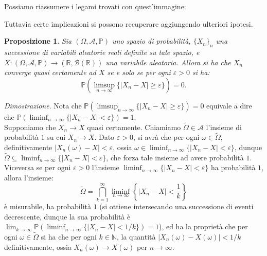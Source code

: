 \documentclass[11pt]{book}
\makeatletter
\theoremstyle{Definizione}
\theoremstyle{TeoremaProposizioneLemmaCorollario}
\newtheorem{mypropo}[myteo]{Proposizione}
\theoremstyle{OsservazioneNota}
\renewenvironment{proof}[1][\proofname]{\par
  \normalfont \topsep6\p@\@plus6\p@\relax
  \trivlist
  \item[\hskip\labelsep
        \itshape
    #1\@addpunct{.}]\ignorespaces
}{%
  \endtrivlist\@endpefalse
}
\newcommand{\R}{\mathbb{R}}
\newcommand{\N}{\mathbb{N}}
\renewcommand{\P}{\mathbb{P}}
\renewenvironment{proof}{\textsl{Dimostrazione}.}{}
\makeatother
\begin{document}
Possiamo riassumere i legami trovati con quest'immagine:
\begin{center}
\end{center}
Tuttavia certe implicazioni si possono recuperare aggiungendo ulteriori ipotesi.
\begin{boxpro}
\begin{mypropo}
Sia $(\Omega,\mathcal{A},\P)$ uno spazio di probabilità, $\{X_n\}_n$ una successione di variabili aleatorie reali definite su tale spazio, e $X:(\Omega,\mathcal{A},\P)\longrightarrow (\R,\mathcal{B}(\R))$ una variabile aleatoria. Allora si ha che $X_n$ converge quasi certamente ad $X$ se e solo se per ogni $\varepsilon > 0$ si ha:
$$
\P\left(\limsup_{n \to \infty} \{|X_n-X| \geq \varepsilon\}\right) = 0.
$$
\end{mypropo}
\tcblower
\begin{proof}
Nota che $\P(\limsup_{n\to\infty}\{|X_n-X|\geq \varepsilon\}) = 0$ equivale a dire che $\P(\liminf_{n\to\infty}\{|X_n-X|<\varepsilon\}) = 1$.\\
Supponiamo che $X_n \to X$ quasi certamente. Chiamiamo $\widetilde{\Omega}\in \mathcal{A}$ l'insieme di probabilità $1$ su cui $X_n \to X$. Dato $\varepsilon > 0$, si avrà che per ogni $\omega\in \widetilde{\Omega}$, definitivamente $|X_n(\omega)-X| < \varepsilon$, ossia $\omega \in \liminf_{n\to\infty}\{|X_n-X|<\varepsilon\}$, dunque $\widetilde{\Omega} \subseteq \liminf_{n\to\infty}\{|X_n-X|<\varepsilon\}$, che forza tale insieme ad avere probabilità $1$. Viceversa se per ogni $\varepsilon>0$ l'insieme $\liminf_{n\to\infty} \{|X_n-X| < \varepsilon\}$ ha probabilità $1$, allora l'insieme:
$$
\widetilde{\Omega} = \bigcap_{k = 1}^\infty \liminf_{n\to\infty} \left\{|X_n-X|< \frac{1}{k}\right\}
$$
è misurabile, ha probabilità $1$ (si ottiene intersecando una successione di eventi decrescente, dunque la sua probabilità è $\lim_{k\to \infty} \P(\liminf_{n\to\infty}\{|X_n-X|<1/k\}) = 1$), ed ha la proprietà che per ogni $\omega\in \widetilde{\Omega}$ si ha che per ogni $k \in \N$, la quantità $|X_n(\omega)-X(\omega)| < 1/k$ definitivamente, ossia $X_n(\omega) \to X(\omega)$ per $n\to\infty$.
\end{proof}
\end{boxpro}
\end{document}

